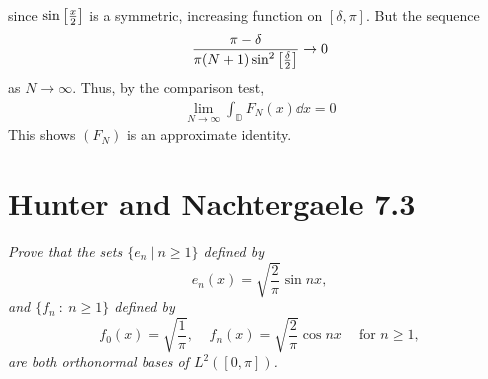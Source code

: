\documentclass[12pt]{article}
\theoremstyle{plain}
\begin{document}
\begin{enumerate}[\bf (a)]
\begin{align*}
        \end{align*}
        since $\sin\qty[\frac{x}{2}]$ is a symmetric, increasing function on $[\delta, \pi]$.  But the sequence
        \begin{align*}
            \frac{\pi - \delta}{\pi(N+1)\sin^2\qty[\frac{\delta}{2}]} \rightarrow 0
        \end{align*}
        as $N \rightarrow \infty$.  Thus, by the comparison test,
        \begin{align*}
            \lim_{N\rightarrow\infty}\int_\mathbb{D}F_N(x)\dd x = 0
        \end{align*}
        This shows $(F_N)$ is an approximate identity.
\end{enumerate}

\section*{Hunter and Nachtergaele 7.3}
\emph{Prove that the sets $\{e_n\ |\ n \geq 1\}$ defined by $$e_n(x) = \sqrt{\frac{2}{\pi}}\sin nx,$$ and $\{f_n\ :\ n \geq 1\}$ defined by $$f_0(x) = \sqrt{\frac{1}{\pi}},\ \ \ \ \ f_n(x) = \sqrt{\frac{2}{\pi}}\cos nx\ \ \ \ \text{ for } n \geq 1,$$ are both orthonormal bases of $L^2([0,\pi])$.} \\
\end{document}
